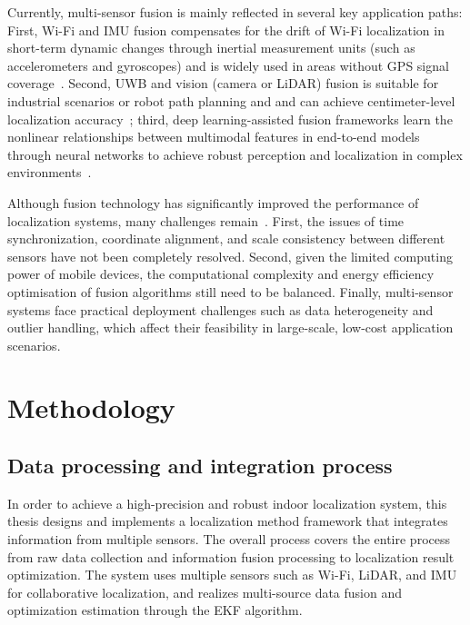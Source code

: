 \documentclass[12pt,a4paper]{article}
\numberwithin{equation}{section}
\begin{document}
Currently, multi-sensor fusion is mainly reflected in several key application
paths: First, Wi-Fi and IMU fusion compensates for the drift of Wi-Fi
localization in short-term dynamic changes through inertial measurement units
(such as accelerometers and gyroscopes) and is widely used in areas without GPS
signal coverage~\cite{liu2019fusion}. Second, UWB and vision (camera or LiDAR)
fusion is suitable for industrial scenarios or robot path planning and and can
achieve centimeter-level localization accuracy~\cite{gu2020fusion}; third, deep
learning-assisted fusion frameworks learn the nonlinear relationships between
multimodal features in end-to-end models through neural networks to achieve
robust perception and localization in complex environments~\cite{zhou2022deep}.

Although fusion technology has significantly improved the performance of
localization systems, many challenges remain~\cite{zafari2019survey}. First, the
issues of time synchronization, coordinate alignment, and scale consistency
between different sensors have not been completely resolved. Second, given the
limited computing power of mobile devices, the computational complexity and
energy efficiency optimisation of fusion algorithms still need to be
balanced. Finally, multi-sensor systems face practical deployment challenges
such as data heterogeneity and outlier handling, which affect their feasibility
in large-scale, low-cost application scenarios.


\newpage
\section{Methodology}
\subsection{Data processing and integration process}
In order to achieve a high-precision and robust indoor localization system, this
thesis designs and implements a localization method framework that integrates
information from multiple sensors. The overall process covers the entire process
from raw data collection and information fusion processing to localization
result optimization. The system uses multiple sensors such as Wi-Fi, LiDAR, and
IMU for collaborative localization, and realizes multi-source data fusion and
optimization estimation through the EKF algorithm.
\end{document}
